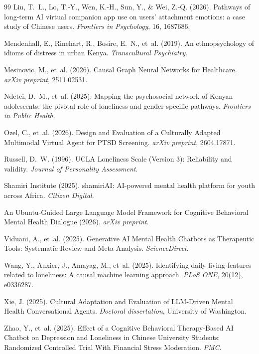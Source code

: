\documentclass[12pt,a4paper]{article}
\begin{document}
\begin{thebibliography}{99}
Liu, T.~L., Lo, T.-Y., Wen, K.-H., Sun, Y., \& Wei, Z.-Q. (2026).
\newblock Pathways of long-term AI virtual companion app use on users' attachment emotions: a case study of Chinese users.
\newblock \textit{Frontiers in Psychology}, 16, 1687686.

Mendenhall, E., Rinehart, R., Bosire, E.~N., et~al. (2019).
\newblock An ethnopsychology of idioms of distress in urban Kenya.
\newblock \textit{Transcultural Psychiatry}.

Mesinovic, M., et~al. (2026).
\newblock Causal Graph Neural Networks for Healthcare.
\newblock \textit{arXiv preprint}, 2511.02531.

Ndetei, D.~M., et~al. (2025).
\newblock Mapping the psychosocial network of Kenyan adolescents: the pivotal role of loneliness and gender-specific pathways.
\newblock \textit{Frontiers in Public Health}.

Ozel, C., et~al. (2026).
\newblock Design and Evaluation of a Culturally Adapted Multimodal Virtual Agent for PTSD Screening.
\newblock \textit{arXiv preprint}, 2604.17871.

Russell, D.~W. (1996).
\newblock UCLA Loneliness Scale (Version 3): Reliability and validity.
\newblock \textit{Journal of Personality Assessment}.

Shamiri Institute (2025).
\newblock shamiriAI: AI-powered mental health platform for youth across Africa.
\newblock \textit{Citizen Digital}.

An Ubuntu-Guided Large Language Model Framework for Cognitive Behavioral Mental Health Dialogue (2026).
\newblock \textit{arXiv preprint}.

Viduani, A., et~al. (2025).
\newblock Generative AI Mental Health Chatbots as Therapeutic Tools: Systematic Review and Meta-Analysis.
\newblock \textit{ScienceDirect}.

Wang, Y., Auxier, J., Amayag, M., et~al. (2025).
\newblock Identifying daily-living features related to loneliness: A causal machine learning approach.
\newblock \textit{PLoS ONE}, 20(12), e0336287.

Xie, J. (2025).
\newblock Cultural Adaptation and Evaluation of LLM-Driven Mental Health Conversational Agents.
\newblock \textit{Doctoral dissertation}, University of Washington.

Zhao, Y., et~al. (2025).
\newblock Effect of a Cognitive Behavioral Therapy-Based AI Chatbot on Depression and Loneliness in Chinese University Students: Randomized Controlled Trial With Financial Stress Moderation.
\newblock \textit{PMC}.

\end{thebibliography}
\end{document}
